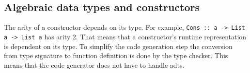 





\subsection{Algebraic data types and constructors}

The arity of a constructor depends on its type. For example, \texttt{Cons :: a -> List a -> List a} has arity 2. That means that a constructor's runtime representation is dependent on its type.
To simplify the code generation step the conversion from type signature to function definition is done by the type checker. This means that the code generator does not have to handle \glspl{adt}. 

